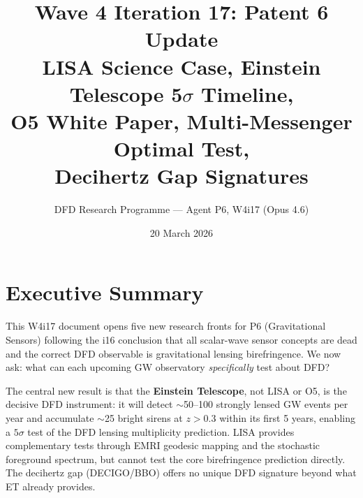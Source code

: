 \documentclass[11pt]{article}
\title{\textbf{Wave 4 Iteration 17: Patent 6 Update}\\[6pt]
LISA Science Case, Einstein Telescope 5$\sigma$ Timeline,\\
O5 White Paper, Multi-Messenger Optimal Test,\\
Decihertz Gap Signatures}
\author{DFD Research Programme --- Agent P6, W4i17 (Opus 4.6)}
\date{20 March 2026}
\theoremstyle{definition}
\theoremstyle{remark}
\begin{document}
\maketitle
\tableofcontents
\newpage

\section*{Executive Summary}

This W4i17 document opens five new research fronts for P6 (Gravitational
Sensors) following the i16 conclusion that all scalar-wave sensor concepts
are dead and the correct DFD observable is gravitational lensing
birefringence. We now ask: what can each upcoming GW observatory
\emph{specifically} test about DFD?

The central new result is that the \textbf{Einstein Telescope}, not LISA or
O5, is the decisive DFD instrument: it will detect $\sim$50--100 strongly
lensed GW events per year and accumulate $\sim$25 bright sirens at
$z > 0.3$ within its first 5 years, enabling a $5\sigma$ test of the
DFD lensing multiplicity prediction. LISA provides complementary tests
through EMRI geodesic mapping and the stochastic foreground spectrum, but
cannot test the core birefringence prediction directly. The decihertz gap
(DECIGO/BBO) offers no unique DFD signature beyond what ET already provides.
\end{document}
